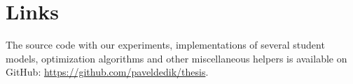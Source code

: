 \chapter{Links}

The source code with our experiments, implementations of several student models, optimization algorithms and other miscellaneous helpers is available on GitHub: \url{https://github.com/paveldedik/thesis}.
